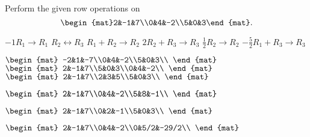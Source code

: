 

\begin{Exercise}[
name={},
title={}, 
difficulty=0,
origin={\cite{GH}}]
Perform the given row operations on $$\begin{mat}2&-1&7\\0&4&-2\\5&0&3\end{mat}.$$
\begin{multicols}{2}
\Question $-1R_1\rightarrow R_1$
\Question $R_2\leftrightarrow R_3$
\Question $R_1+R_2\rightarrow R_2$
\Question $2R_2+R_3\rightarrow R_3$
\Question $\frac12R_2\rightarrow R_2$
\Question $-\frac52R_1+R_3\rightarrow R_3$
\EndCurrentQuestion
\end{multicols}
\end{Exercise}

\begin{Answer}
\Question 
$
\begin{mat}
-2&1&-7\\0&4&-2\\5&0&3\\
\end{mat}
$
\Question 
$
\begin{mat}
2&-1&7\\5&0&3\\0&4&-2\\
\end{mat}
$
\Question
$
\begin{mat}
2&-1&7\\2&3&5\\5&0&3\\
\end{mat}
$

\Question
$
\begin{mat}
2&-1&7\\0&4&-2\\5&8&-1\\
\end{mat}
$

\Question
$
\begin{mat}
2&-1&7\\0&2&-1\\5&0&3\\
\end{mat}
$

\Question
$
\begin{mat}
2&-1&7\\0&4&-2\\0&5/2&-29/2\\
\end{mat}
$


\end{Answer}
